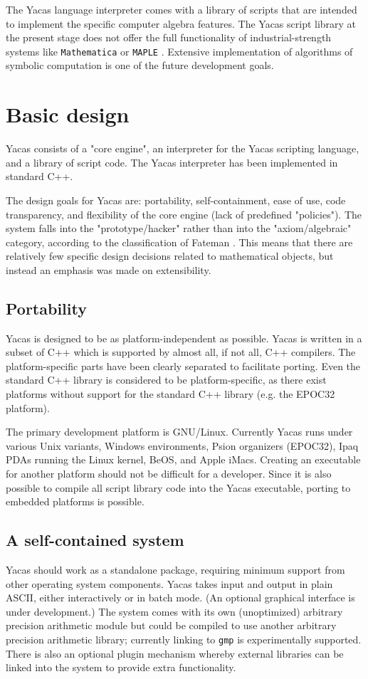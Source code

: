 \documentclass{llncs}
\begin{document}
The Yacas language interpreter comes with a library of scripts that are
intended to implement the specific computer algebra features. The Yacas script library
at the present stage does not offer the full functionality of
industrial-strength systems like \texttt{Mathematica} \cite{W96} or \texttt{MAPLE} \cite{M98}. Extensive
implementation of algorithms of symbolic computation is one of the future
development goals.


\section{Basic design}
Yacas consists of a "core engine", an interpreter for the Yacas scripting
language, and a library of script code. The Yacas interpreter has been
implemented in standard C++.


The design goals for Yacas are: portability, self-containment, ease of use,
code transparency, and flexibility of the core engine (lack of predefined "policies"). The system falls into the "prototype/hacker" rather than into the "axiom/algebraic" category, according to the classification of Fateman \cite{F90}. This means that there are relatively few specific design decisions related to mathematical objects, but instead an emphasis was made on extensibility.


\subsection*{Portability}
Yacas is designed to be as platform-independent as possible. Yacas is written
in a subset of C++ which is supported by almost all, if not all, C++ compilers.
The platform-specific parts have been clearly separated to facilitate porting.
Even the standard C++ library is considered to be platform-specific, as there
exist  platforms without support for the standard C++ library (e.g. the
EPOC32 platform).


The primary development platform is GNU/Linux. Currently Yacas runs under
various Unix variants, Windows environments, Psion organizers (EPOC32),
Ipaq PDAs running the Linux kernel,
BeOS, and Apple iMacs. Creating an executable for another platform
should not be difficult for a developer. Since it is also possible to compile
all script library code into the Yacas executable, porting to embedded
platforms is possible.


\subsection*{A self-contained system}
Yacas should work as a standalone package, requiring minimum support from other
operating system components. Yacas takes input and output in plain ASCII,
either interactively or in batch mode. (An optional graphical interface is under development.) The system comes with its own
(unoptimized) arbitrary precision arithmetic module but could be compiled to
use another arbitrary precision arithmetic library; currently linking to \texttt{gmp}
is experimentally supported. There is also an optional plugin mechanism
whereby external libraries can be linked into the system to provide extra
functionality.
\end{document}
